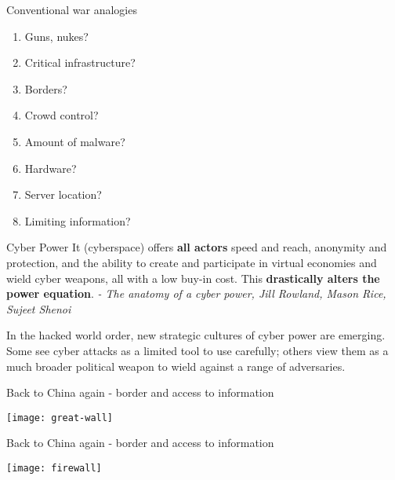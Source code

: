 \documentclass[xcolor=table]{beamer}
\begin{document}
\begin{frame}{Conventional war analogies}
\begin{multicols}{2}
\begin{enumerate}
    \item \Large{Guns, nukes?}
    \item \Large{Critical infrastructure?}
    \item \Large{Borders?}
    \item \Large{Crowd control?}
    \item \Large{Amount of malware?}
    \item \Large{Hardware?}
    \item \Large{Server location?}
    \item \Large{Limiting information?}
\end{enumerate}
\end{multicols}
\end{frame}

\begin{frame}{Cyber Power}
\Large{
It (cyberspace) offers \textbf{all actors} speed and reach, anonymity and protection, and the ability to create and participate in virtual economies and wield cyber weapons, all with a low buy-in cost. This \textbf{drastically alters the power equation}.} \small{\textit{- The anatomy of a cyber power, Jill Rowland, Mason Rice, Sujeet Shenoi}}
\end{frame}

\begin{frame}{In the hacked world order, new strategic cultures of cyber power are emerging.}
\Large{
Some see cyber attacks as a limited tool to use carefully; others view them as a much broader political weapon to wield against a range of adversaries.
}
\end{frame}

\begin{frame}{Back to China again - border and access to information}
\centerline{\texttt{[image: great-wall]}}
\end{frame}

\begin{frame}{Back to China again - border and access to information}
\centerline{\texttt{[image: firewall]}}
\end{frame}
\end{document}
